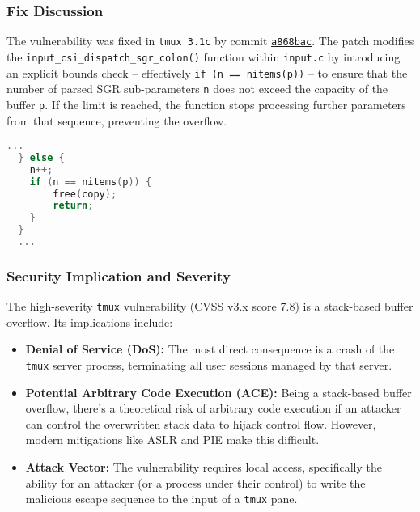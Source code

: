 \subsubsection{Fix Discussion}
\label{ssec:fix_cve_2020_27347}

The vulnerability was fixed in \texttt{tmux 3.1c} by commit \href{https://github.com/tmux/tmux/commit/a868bacb46e3c900530bed47a1c6f85b0fbe701c}{\texttt{a868bac}}. The patch modifies the \texttt{input\_csi\_dispatch\_sgr\_colon()} function within \texttt{input.c} by introducing an explicit bounds check -- effectively \texttt{if (n == nitems(p))} -- to ensure that the number of parsed SGR sub-parameters \texttt{n} does not exceed the capacity of the buffer \texttt{p}. If the limit is reached, the function stops processing further parameters from that sequence, preventing the overflow.

\begin{lstlisting}[language=C, caption=Fixed logic: Bounds check added to prevent stack buffer overflow in else statement, label={lst:fixed-sgr-simplified}]
  ...
  } else {
    n++;
    if (n == nitems(p)) {
        free(copy);
        return;
    }
  }
  ...
\end{lstlisting}

\subsubsection{Security Implication and Severity}
\label{ssec:implications_cve_2020_27347}

The high-severity {\texttt{tmux}} vulnerability \cite{CVE-2020-27347} (CVSS v3.x score 7.8) is a stack-based buffer overflow. Its implications include:

\begin{itemize}
	\item \textbf{Denial of Service (DoS):} The most direct consequence is a crash of the \texttt{tmux} server process, terminating all user sessions managed by that server.
	\item \textbf{Potential Arbitrary Code Execution (ACE):} Being a stack-based buffer overflow, there's a theoretical risk of arbitrary code execution if an attacker can control the overwritten stack data to hijack control flow. However, modern mitigations like ASLR and PIE make this difficult.
	\item \textbf{Attack Vector:} The vulnerability requires local access, specifically the ability for an attacker (or a process under their control) to write the malicious escape sequence to the input of a \texttt{tmux} pane.
\end{itemize}
